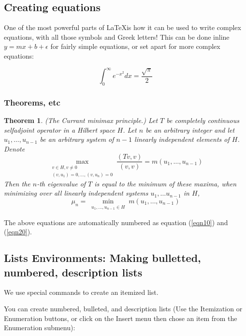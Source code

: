 \documentclass{book}\usepackage{knitr}
\newtheorem{theorem}{Theorem}
\begin{document}
\subsection{Creating equations}

One of the most powerful parts of \LaTeX is how it can be used to write complex equations, with all those symbols and Greek letters! This can be done inline $y = mx + b + \epsilon$ for fairly simple equations, or set apart for more complex equations:

\begin{equation}
\int_0^\infty e^{-x^2} dx=\frac{\sqrt{\pi}}{2}
\end{equation}

\subsubsection{Theorems, etc}
\begin{theorem}
(The Currant minimax principle.) Let $T$ be completely continuous selfadjoint operator
in a Hilbert space $H$. Let $n$ be an arbitrary integer and let $u_1,\ldots,u_{n-1}$ be
an arbitrary system of $n-1$ linearly independent elements of $H$. Denote
\begin{equation}
\max_{\substack{v\in H, v\neq
0\\(v,u_1)=0,\ldots,(v,u_n)=0}}\frac{(Tv,v)}{(v,v)}=m(u_1,\ldots, u_{n-1})
\label{eqn10}
\end{equation}
Then the $n$-th eigenvalue of $T$ is equal to the minimum of these maxima, when
minimizing over all linearly independent systems $u_1,\ldots u_{n-1}$ in $H$,
\begin{equation}
\mu_n = \min_{\substack{u_1,\ldots, u_{n-1}\in H}} m(u_1,\ldots, u_{n-1}) \label{eqn20}
\end{equation}
\end{theorem}
The above equations are automatically numbered as equation (\ref{eqn10}) and
(\ref{eqn20}).


\subsection{Lists Environments: Making bulletted, numbered, description lists}

We use special commands to create an itemized list.

You can create numbered, bulleted, and description lists
(Use the Itemization or Enumeration buttons, or click on the Insert menu
then chose an item from the Enumeration submenu):
\end{document}
